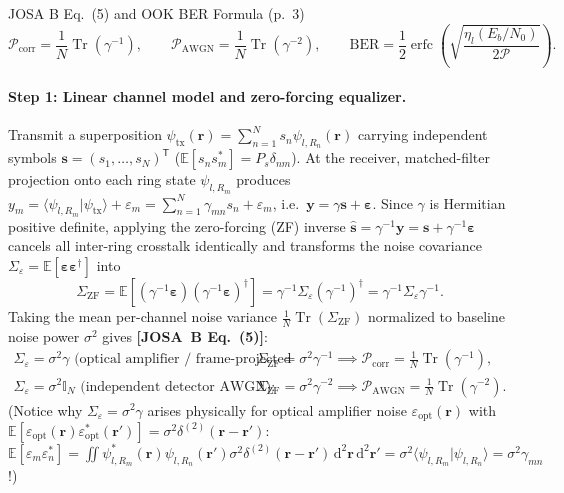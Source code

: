 \documentclass[10pt,letterpaper]{article}
\newcommand{\braket}[2]{\langle #1 | #2 \rangle}
\newcommand{\dd}{\mathrm{d}}
\newcommand{\josb}[1]{\textbf{[JOSA~B Eq.~(#1)]}}
\numberwithin{equation}{section}
\begin{document}
\begin{targeteq}{JOSA B Eq.~(5) and OOK BER Formula (p.~3)}
\[
  \mathcal{P}_{\mathrm{corr}} = \frac{1}{N}\operatorname{Tr}(\gamma^{-1}), \qquad \mathcal{P}_{\mathrm{AWGN}} = \frac{1}{N}\operatorname{Tr}(\gamma^{-2}), \qquad \mathrm{BER} = \frac{1}{2}\operatorname{erfc}\!\left(\sqrt{\frac{\eta_l(E_b/N_0)}{2\mathcal{P}}}\right).
\]
\end{targeteq}

\paragraph*{Step 1: Linear channel model and zero-forcing equalizer.}
Transmit a superposition $\psi_{\mathrm{tx}}(\mathbf{r}) = \sum_{n=1}^N s_n \psi_{l,R_n}(\mathbf{r})$ carrying independent symbols $\mathbf{s} = (s_1,\dots,s_N)^{\mathsf{T}}$ ($\mathbb{E}[s_n s_m^*] = P_s\delta_{nm}$). At the receiver, matched-filter projection onto each ring state $\psi_{l,R_m}$ produces $y_m = \braket{\psi_{l,R_m}}{\psi_{\mathrm{tx}}} + \varepsilon_m = \sum_{n=1}^N \gamma_{mn} s_n + \varepsilon_m$, i.e.\ $\mathbf{y} = \gamma\mathbf{s} + \boldsymbol{\varepsilon}$. Since $\gamma$ is Hermitian positive definite, applying the zero-forcing (ZF) inverse $\hat{\mathbf{s}} = \gamma^{-1}\mathbf{y} = \mathbf{s} + \gamma^{-1}\boldsymbol{\varepsilon}$ cancels all inter-ring crosstalk identically and transforms the noise covariance $\Sigma_\varepsilon = \mathbb{E}[\boldsymbol{\varepsilon}\boldsymbol{\varepsilon}^\dagger]$ into
\begin{equation}
  \Sigma_{\mathrm{ZF}} = \mathbb{E}\!\left[(\gamma^{-1}\boldsymbol{\varepsilon})(\gamma^{-1}\boldsymbol{\varepsilon})^\dagger\right] = \gamma^{-1}\Sigma_\varepsilon (\gamma^{-1})^\dagger = \gamma^{-1}\Sigma_\varepsilon\gamma^{-1}.
\end{equation}
Taking the mean per-channel noise variance $\frac{1}{N}\operatorname{Tr}(\Sigma_{\mathrm{ZF}})$ normalized to baseline noise power $\sigma^2$ gives \josb{5}:
\begin{align}
  \Sigma_\varepsilon = \sigma^2\gamma\text{ (optical amplifier / frame-projected white noise)}: &\quad \Sigma_{\mathrm{ZF}} = \sigma^2\gamma^{-1} \implies \mathcal{P}_{\mathrm{corr}} = \frac{1}{N}\operatorname{Tr}(\gamma^{-1}), \\
  \Sigma_\varepsilon = \sigma^2\mathbb{I}_N\text{ (independent detector AWGN)}: &\quad \Sigma_{\mathrm{ZF}} = \sigma^2\gamma^{-2} \implies \mathcal{P}_{\mathrm{AWGN}} = \frac{1}{N}\operatorname{Tr}(\gamma^{-2}).
\end{align}
(Notice why $\Sigma_\varepsilon = \sigma^2\gamma$ arises physically for optical amplifier noise $\varepsilon_{\mathrm{opt}}(\mathbf{r})$ with $\mathbb{E}[\varepsilon_{\mathrm{opt}}(\mathbf{r})\varepsilon_{\mathrm{opt}}^*(\mathbf{r}')] = \sigma^2\delta^{(2)}(\mathbf{r}-\mathbf{r}')$: $\mathbb{E}[\varepsilon_m\varepsilon_n^*] = \iint \psi_{l,R_m}^*(\mathbf{r})\psi_{l,R_n}(\mathbf{r}')\sigma^2\delta^{(2)}(\mathbf{r}-\mathbf{r}')\,\dd^2\mathbf{r}\,\dd^2\mathbf{r}' = \sigma^2\braket{\psi_{l,R_m}}{\psi_{l,R_n}} = \sigma^2\gamma_{mn}$!)
\end{document}
